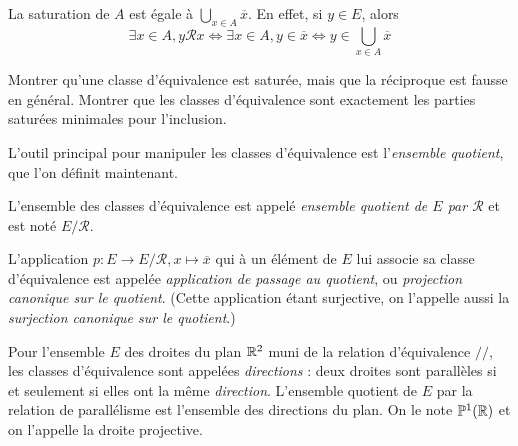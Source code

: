 \begin{remarque} La saturation de $A$ est égale à $\bigcup_{x\in A} \overline x$. En effet, si $y\in E$, alors 
\[
\exists x\in A, y\mathcal R x
\iff \exists x\in A, y\in \overline x
\iff y\in \bigcup_{x\in A} \overline x 
\]
\end{remarque}

\begin{exercice} Montrer qu'une classe d'équivalence est saturée, mais que la réciproque est fausse en général. Montrer que les classes d'équivalence sont exactement les parties saturées minimales pour l'inclusion.
\end{exercice}

L'outil principal pour manipuler les classes d'équivalence est l'\emph{ensemble quotient}, que l'on définit maintenant.

\begin{definition}

L'ensemble des classes d'équivalence est appelé \emph{ensemble quotient de $E$ par $\mathcal R$} et est noté $E/{\mathcal R}$.

L'application $p : E \to E/\mathcal R, x\mapsto \overline{x}$ qui à un élément de $E$ lui associe sa classe d'équivalence est appelée \emph{application de passage au quotient}, ou \emph{projection canonique sur le quotient}. (Cette application étant surjective, on l'appelle aussi la \emph{surjection canonique sur le quotient}.)
\end{definition}

\begin{exemple}
Pour l'ensemble $E$ des droites du plan $\mathbb{R}^2$ muni de la relation d'équivalence $//$, les classes d'équivalence sont appelées \emph{directions} : deux droites sont parallèles si et seulement si elles ont la même \emph{direction}. L'ensemble quotient de $E$ par la relation de parallélisme est l'ensemble des directions du plan. On le note $\mathbb{P}^1(\mathbb{R})$ et on l'appelle la droite projective.
\end{exemple}

